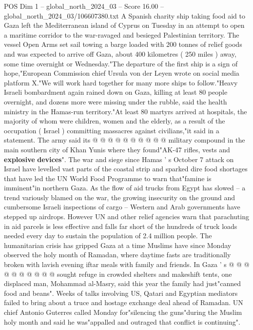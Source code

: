 \begin{textsample}{POS Dim 1 – global\_north\_2024\_03 – Score 16.00 – global\_north\_2024\_03/106607380.txt}  \label{ex:f1_pos_388}
A Spanish charity ship taking food aid to Gaza left the Mediterranean island of Cyprus on Tuesday in an attempt to open a maritime corridor to the war-ravaged and besieged Palestinian territory.
The vessel Open Arms set sail towing a barge loaded with 200 tonnes of relief goods and was expected to arrive off Gaza, about 400 kilometres ( 250 miles ) away, some time overnight or Wednesday."The departure of the first ship is a sign of hope,"European Commission chief Ursula von der Leyen wrote on social media platform X."We will work hard together for many more ships to follow."Heavy Israeli bombardment again rained down on Gaza, killing at least 80 people overnight, and dozens more were missing under the rubble, said the health ministry in the Hamas-run territory."At least 80 martyrs arrived at hospitals, the majority of whom were children, women and the elderly, as a result of the occupation ( Israel ) committing massacres against civilians,"it said in a statement.
The army said its @ @ @ @ @ @ @ @ @ @ military compound in the main southern city of Khan Yunis where they found"AK-47 rifles, vests and \textbf{explosive} \textbf{devices}".
The war and siege since Hamas ' s October 7 attack on Israel have levelled vast parts of the coastal strip and sparked dire food shortages that have led the UN World Food Programme to warn that"famine is imminent"in northern Gaza.
As the flow of aid trucks from Egypt has slowed -- a trend variously blamed on the war, the growing insecurity on the ground and cumbersome Israeli inspections of cargo -- Western and Arab governments have stepped up airdrops.
However UN and other relief agencies warn that parachuting in aid parcels is less effective and falls far short of the hundreds of truck loads needed every day to sustain the population of 2.4 million people.
The humanitarian crisis has gripped Gaza at a time Muslims have since Monday observed the holy month of Ramadan, where daytime fasts are traditionally broken with lavish evening iftar meals with family and friends.
In Gaza ' s @ @ @ @ @ @ @ @ @ @ sought refuge in crowded shelters and makeshift tents, one displaced man, Mohammad al-Masry, said this year the family had just"canned food and beans".
Weeks of talks involving US, Qatari and Egyptian mediators failed to bring about a truce and hostage exchange deal ahead of Ramadan.
UN chief Antonio Guterres called Monday for"silencing the guns"during the Muslim holy month and said he was"appalled and outraged that conflict is continuing".

\end{textsample}
